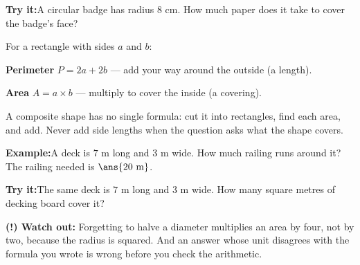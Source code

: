 \documentclass[12pt]{article}
\begin{document}
\begin{tryitbox}
\textbf{Try it:}\quad A circular badge has radius $8$ cm. How much paper does it
take to cover the badge's face?\\[2pt]
\end{tryitbox}


\begin{formulabox}
For a rectangle with sides $a$ and $b$:\par
\smallskip
\textbf{Perimeter} $P = 2a + 2b$ --- add your way around the outside (a length).\par
\textbf{Area} $A = a \times b$ --- multiply to cover the inside (a covering).\par
\smallskip
A composite shape has no single formula: cut it into rectangles, find each area,
and add. Never add side lengths when the question asks what the shape covers.
\end{formulabox}

\begin{examplebox}
\textbf{Example:}\quad A deck is $7$ m long and $3$ m wide. How much railing runs
around it?
The railing needed is $\ans{20\ \text{m}}$.
\end{examplebox}

\begin{tryitbox}
\textbf{Try it:}\quad The same deck is $7$ m long and $3$ m wide. How many square
metres of decking board cover it?\\[2pt]
\end{tryitbox}

\begin{watchoutbox}
\textbf{(!) Watch out:} Forgetting to halve a diameter multiplies an area by
four, not by two, because the radius is squared. And an answer whose unit
disagrees with the formula you wrote is wrong before you check the arithmetic.
\end{watchoutbox}
\end{document}

